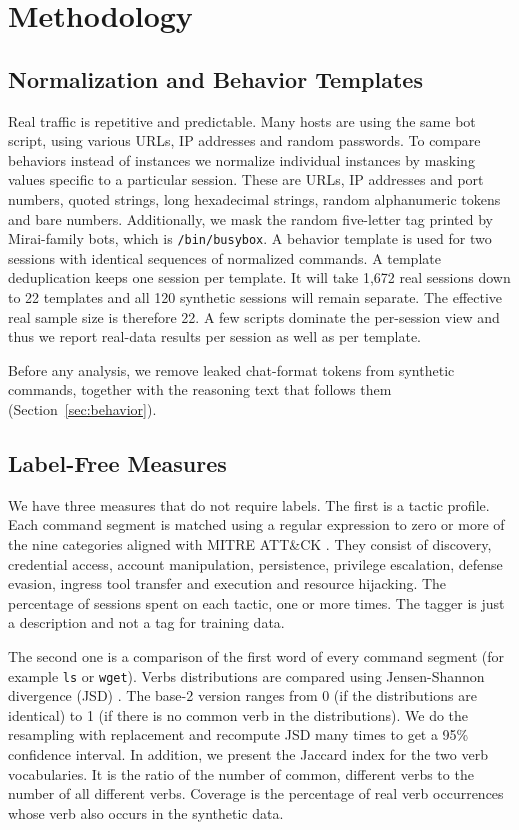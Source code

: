 \documentclass[runningheads]{llncs}
\begin{document}
\section{Methodology}

\subsection{Normalization and Behavior Templates}

Real traffic is repetitive and predictable. Many hosts are using the same bot script, using various URLs, IP addresses and random passwords. To compare behaviors instead of instances we normalize individual instances by masking values specific to a particular session. These are URLs, IP addresses and port numbers, quoted strings, long hexadecimal strings, random alphanumeric tokens and bare numbers. Additionally, we mask the random five-letter tag printed by Mirai-family bots, which is \texttt{/bin/busybox}. A behavior template is used for two sessions with identical sequences of normalized commands. A template deduplication keeps one session per template. It will take 1,672 real sessions down to 22 templates and all 120 synthetic sessions will remain separate. The effective real sample size is therefore 22. A few scripts dominate the per-session view and thus we report real-data results per session as well as per template.

Before any analysis, we remove leaked chat-format tokens from synthetic commands, together with the reasoning text that follows them (Section~\ref{sec:behavior}).

\subsection{Label-Free Measures}

We have three measures that do not require labels. The first is a tactic profile. Each command segment is matched using a regular expression to zero or more of the nine categories aligned with MITRE ATT\&CK \cite{strom2018attack}. They consist of discovery, credential access, account manipulation, persistence, privilege escalation, defense evasion, ingress tool transfer and execution and resource hijacking. The percentage of sessions spent on each tactic, one or more times. The tagger is just a description and not a tag for training data.

The second one is a comparison of the first word of every command segment (for example \texttt{ls} or \texttt{wget}). Verbs distributions are compared using Jensen-Shannon divergence (JSD) \cite{lin1991jsd}. The base-2 version ranges from 0 (if the distributions are identical) to 1 (if there is no common verb in the distributions). We do the resampling with replacement and recompute JSD many times to get a 95\% confidence interval. In addition, we present the Jaccard index for the two verb vocabularies. It is the ratio of the number of common, different verbs to the number of all different verbs. Coverage is the percentage of real verb occurrences whose verb also occurs in the synthetic data.
\end{document}
